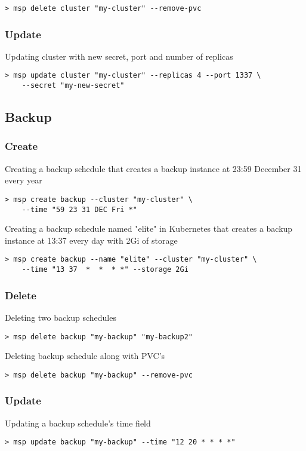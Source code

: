 \begin{lstlisting}
> msp delete cluster "my-cluster" --remove-pvc
\end{lstlisting}

\subsubsection*{Update}
\noindent Updating cluster with new secret, port and number of replicas

\begin{lstlisting}
> msp update cluster "my-cluster" --replicas 4 --port 1337 \
	--secret "my-new-secret"
\end{lstlisting}

\subsection{Backup}

\subsubsection*{Create}
\noindent Creating a backup schedule that creates a backup instance at 23:59 December 31 every year

\begin{lstlisting}
> msp create backup --cluster "my-cluster" \
	--time "59 23 31 DEC Fri *"
\end{lstlisting}

\noindent Creating a backup schedule named "elite" in Kubernetes that creates a backup instance at 13:37 every day with 2Gi of storage

\begin{lstlisting}
> msp create backup --name "elite" --cluster "my-cluster" \
	--time "13 37  *  *  * *" --storage 2Gi
\end{lstlisting}

\subsubsection*{Delete}
\noindent Deleting two backup schedules

\begin{lstlisting}
> msp delete backup "my-backup" "my-backup2"
\end{lstlisting}

\noindent Deleting backup schedule along with PVC's

\begin{lstlisting}
> msp delete backup "my-backup" --remove-pvc
\end{lstlisting}

\subsubsection*{Update}
\noindent Updating a backup schedule's time field

\begin{lstlisting}
> msp update backup "my-backup" --time "12 20 * * * *"
\end{lstlisting}
